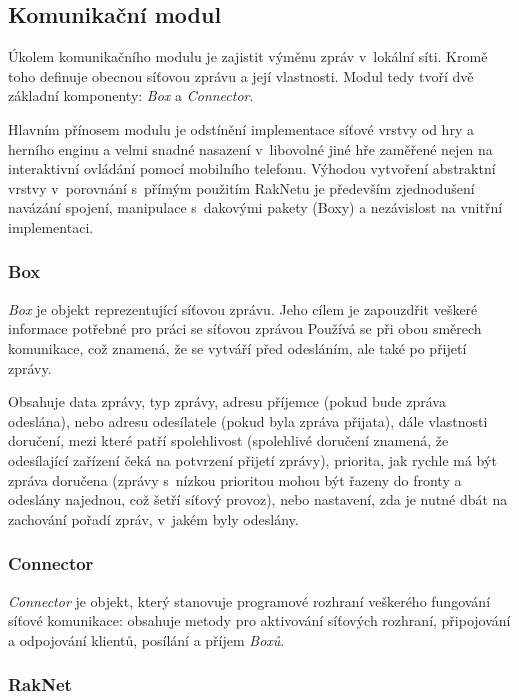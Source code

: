 \documentclass[thesis=B,czech,hidelinks]{FITthesis}[2012/06/26] %
\begin{document}
\subsection{Komunikační modul}

Úkolem komunikačního modulu je zajistit výměnu zpráv v~lokální síti. Kromě toho definuje obecnou síťovou zprávu a její vlastnosti. Modul tedy tvoří dvě základní komponenty: \textit{Box} a \textit{Connector}. 

Hlavním přínosem modulu je odstínění implementace síťové vrstvy od hry a herního enginu a velmi snadné nasazení v~libovolné jiné hře zaměřené nejen na interaktivní ovládání pomocí mobilního telefonu. Výhodou vytvoření abstraktní vrstvy v~porovnání s~přímým použitím RakNetu je především zjednodušení navázání spojení, manipulace s~dakovými pakety (Boxy) a nezávislost na vnitřní implementaci.


\subsubsection{Box}

\textit{Box} je objekt reprezentující síťovou zprávu. Jeho cílem je zapouzdřit veškeré informace potřebné pro práci se síťovou zprávou Používá se při obou směrech komunikace, což znamená, že se vytváří před odesláním, ale také po přijetí zprávy.

Obsahuje data zprávy, typ zprávy, adresu příjemce (pokud bude zpráva odeslána), nebo adresu odesílatele (pokud byla zpráva přijata), dále vlastnosti doručení, mezi které patří spolehlivost (spolehlivé doručení znamená, že odesílající zařízení čeká na potvrzení přijetí zprávy), priorita, jak rychle má být zpráva doručena (zprávy s~nízkou prioritou mohou být řazeny do fronty a odeslány najednou, což šetří síťový provoz), nebo nastavení, zda je nutné dbát na zachování pořadí zpráv, v~jakém byly odeslány.

\subsubsection{Connector}

\textit{Connector} je objekt, který stanovuje programové rozhraní veškerého fungování síťové komunikace: obsahuje metody pro aktivování síťových rozhraní, připojování a odpojování klientů, posílání a příjem \textit{Boxů}. 

\subsubsection{RakNet}
\end{document}
